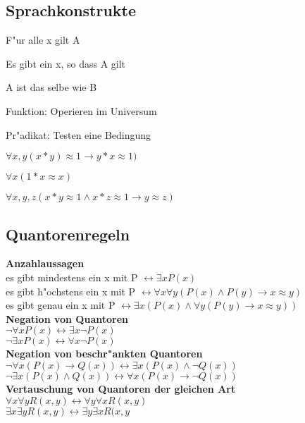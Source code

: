 \documentclass[11pt, a4paper,twocolumn]{scrartcl}
\begin{document}
\subsection{Sprachkonstrukte}
\begin{description}
 \item[$\forall x A$]       F"ur alle x gilt A
 \item[$\exists x A$]    Es gibt ein x, so dass A gilt
 \item[$A \approx B$]    A ist das selbe wie B
 \item[$f(x)$]   Funktion: Operieren im Universum
 \item[$G(x)$]   Pr"adikat: Testen eine Bedingung
 \item $\forall x,y(x*y)\approx 1 \rightarrow y*x\approx 1)$
 \item $\forall x(1*x\approx x)$
 \item $\forall x,y,z(x*y\approx 1 \land x*z\approx 1 \rightarrow y \approx z)$
\end{description}

\subsection{Quantorenregeln}
{\bf Anzahlaussagen}\\
es gibt mindestens ein x mit P $\leftrightarrow \exists x P(x)$\\
es gibt h"ochstens ein x mit P $\leftrightarrow \forall x \forall y(P(x) \land P(y) \rightarrow x \approx y)$\\
es gibt genau ein x mit P $\leftrightarrow \exists x (P(x) \land \forall y (P(y) \rightarrow x \approx y))$\\

{\bf Negation von Quantoren}\\
$\lnot\forall x P(x) \leftrightarrow \exists x \lnot P(x)$\\
$\lnot\exists x P(x) \leftrightarrow \forall x \lnot P(x)$\\

{\bf Negation von beschr"ankten Quantoren}\\
$\lnot \forall x(P(x)\rightarrow Q(x)) \leftrightarrow \exists x (P(x)\land \lnot Q(x))$\\
$\lnot \exists x (P(x)\land Q(x)) \leftrightarrow \forall x(P(x) \rightarrow \lnot Q(x))$\\

{\bf Vertauschung von Quantoren der gleichen Art}\\
$\forall x \forall y R(x,y) \leftrightarrow \forall y \forall x R(x,y)$\\
$\exists x \exists y R(x,y) \leftrightarrow \exists y \exists x R(x,y$\\
\end{document}
